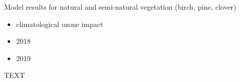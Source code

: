 \documentclass[bg, manuscript]{copernicus}
\begin{document}
Model results for natural and semi-natural vegetation (birch, pine, clover)
\begin{itemize}
\item climatological ozone impact
\item 2018
\item 2019
\end{itemize}


\conclusions  %
TEXT












\appendix
\section{}    %

\subsection{}     %


\noappendix       %


\end{document}
